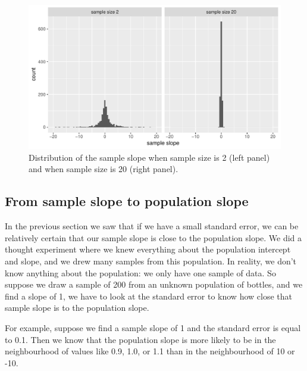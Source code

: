 \documentclass[]{report}\usepackage[]{graphicx}\usepackage[]{color}
\makeatletter
\def\maxwidth{ %
  \ifdim\Gin@nat@width>\linewidth
    \linewidth
  \else
    \Gin@nat@width
  \fi
}
\newenvironment{knitrout}{}{} %
\makeatother
\begin{document}
\begin{knitrout}
\color{fgcolor}\begin{figure}

{\centering \includegraphics[width=\maxwidth]{figure/inf_7-1} 

}

\caption[Distribution of the sample slope when sample size is 2 (left panel) and when sample size is 20 (right panel)]{Distribution of the sample slope when sample size is 2 (left panel) and when sample size is 20 (right panel).}\label{fig:inf_7}
\end{figure}


\end{knitrout}


\subsection{From sample slope to population slope}

In the previous section we saw that if we have a small standard error, we can be relatively certain that our sample slope is close to the population slope. We did a thought experiment where we knew everything about the population intercept and slope, and we drew many samples from this population. In reality, we don't know anything about the population: we only have one sample of data. So suppose we draw a sample of 200 from an unknown population of bottles, and we find a slope of 1, we have to look at the standard error to know how close that sample slope is to the population slope.

For example, suppose we find a sample slope of 1 and the standard error is equal to 0.1. Then we know that the population slope is more likely to be in the neighbourhood of values like 0.9, 1.0, or 1.1 than in the neighbourhood of 10 or -10.
\end{document}
